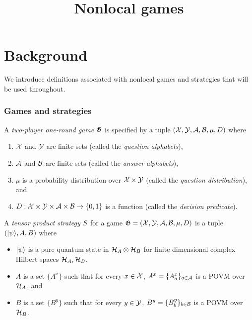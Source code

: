 



\part{Background}
\label{book-part-background}


\title{Nonlocal games}
\label{nonlocalgames}

\maketitle


\tableofcontents


We introduce definitions associated with nonlocal games and strategies that will
be used throughout.

\section{Games and strategies}
\label{sec:strat}

\begin{definition}
  \label{def:game}
  A \emph{two-player one-round game} $\game$ is specified by a tuple
  $(\cal{X}, \cal{Y}, \cal{A}, \cal{B}, \mu, D)$ where
  \begin{enumerate}
  \item $\cal{X}$ and $\cal{Y}$ are finite sets (called the \emph{question
      alphabets}),
  \item $\cal{A}$ and $\cal{B}$ are finite sets (called the \emph{answer
      alphabets}),
  \item $\mu$ is a probability distribution over $\cal{X} \times \cal{Y}$
    (called the \emph{question distribution}), and
  \item $D: \cal{X} \times \cal{Y} \times \cal{A} \times \cal{B} \to \{0,1\}$ is
    a function (called the \emph{decision predicate}).
  \end{enumerate}
\end{definition}

\begin{definition}
  \label{def:tensor-product-strategy}
  A \emph{tensor product strategy} $\strategy$ for a game $\game = (\cal{X},
  \cal{Y}, \cal{A}, \cal{B}, \mu, D)$ is a tuple $(\ket{\psi}, A, B)$ where
  \begin{itemize}
	\item $\ket{\psi}$ is a pure quantum state in $\mH_A \otimes \mH_B$ for finite
    dimensional complex Hilbert spaces $\mH_A, \mH_B$,
	\item $A$ is a set $\{A^x\}$ such that for every $x \in \cal{X}$, $A^x =
    \{A^x_a \}_{a \in \cal{A}}$ is a POVM over $\mH_A$, and
	\item $B$ is a set $\{B^y\}$ such that for every $y \in \cal{Y}$, $B^y =
    \{B^y_b \}_{b \in \cal{B}}$ is a POVM over $\mH_B$.
\end{itemize}
\end{definition}

